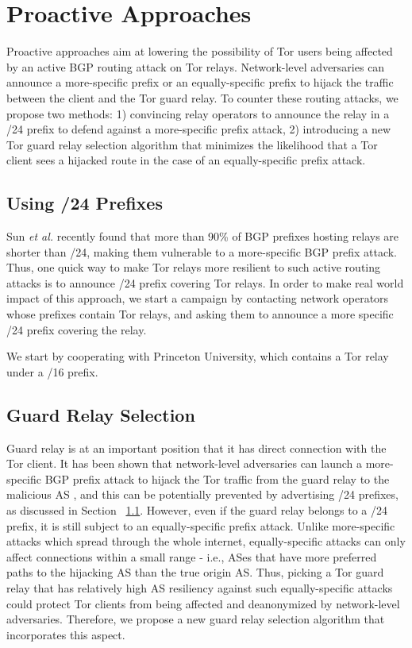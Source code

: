 \section{Proactive Approaches}
Proactive approaches aim at lowering the possibility of Tor users being affected by an active BGP routing attack on Tor relays. Network-level adversaries can announce a more-specific prefix or an equally-specific prefix to hijack the traffic between the client and the Tor guard relay. To counter these routing attacks, we propose two methods: 1) convincing relay operators to announce the relay in a /24 prefix to defend against a more-specific prefix attack, 2) introducing a new Tor guard relay selection algorithm that minimizes the likelihood that a Tor client sees a hijacked route in the case of an equally-specific prefix attack.

\subsection{Using /24 Prefixes}
\label{subsec:24prefix}

Sun \emph{et al.} \cite{sun2015raptor} recently found that more than 90\% of BGP prefixes hosting relays are
shorter than /24, making them vulnerable to a more-specific BGP prefix attack. Thus, one quick way to make Tor relays more resilient to such active routing attacks is to announce /24 prefix covering Tor relays. In order to make real world impact of this approach, we start a campaign by contacting network operators whose prefixes contain Tor relays, and asking them to announce a more specific /24 prefix covering the relay. 

We start by cooperating with Princeton University, which contains a Tor relay under a /16 prefix. 

\subsection{Guard Relay Selection}
\label{subsec:relayselection}

Guard relay is at an important position that it has direct connection with the Tor client. It has been shown that network-level adversaries can launch a more-specific BGP prefix attack to hijack the Tor traffic from the guard relay to the malicious AS \cite{sun2015raptor}, and this can be potentially prevented by advertising /24 prefixes, as discussed in Section ~\ref{subsec:24prefix}. However, even if the guard relay belongs to a /24 prefix, it is still subject to an equally-specific prefix attack. Unlike more-specific attacks which spread through the whole internet, equally-specific attacks can only affect connections within a small range - i.e., ASes that have more preferred paths to the hijacking AS than the true origin AS. Thus, picking a Tor guard relay that has relatively high AS resiliency against such equally-specific attacks could protect Tor clients from being affected and deanonymized by network-level adversaries. Therefore, we propose a new guard relay selection algorithm that incorporates this aspect.

